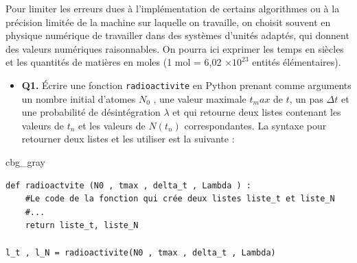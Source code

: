 \documentclass[%
oneside,                 %
final,                   %
10pt]{article}
\newenvironment{_cod_tight}[1]{
   \def\FrameCommand{\colorbox{#1}}
   \FrameRule0.6pt\MakeFramed {\FrameRestore}\vskip3mm}
   {\vskip0mm\endMakeFramed}
\newenvironment{cod}[1]{
\bgroup\rmfamily
\fboxsep=0mm\relax
\begin{_cod_tight}{#1}
\list{}{\parsep=-2mm\parskip=0mm\topsep=0pt\leftmargin=2mm
\rightmargin=2\leftmargin\leftmargin=4pt\relax}
\item\relax}
{\endlist\end{_cod_tight}\egroup}
\begin{document}
\vspace{6mm}



Pour limiter les erreurs dues à l’implémentation de certains algorithmes ou à la précision limitée de la machine sur laquelle on travaille, on choisit souvent en physique numérique de travailler dans des systèmes d’unités adaptés, qui donnent des valeurs numériques raisonnables. On pourra ici exprimer les temps en siècles et les quantités de matières en moles (1 mol = 6,02 $\times 10^{23}$ entités élémentaires).

\begin{itemize}
\item \textbf{Q1.} Écrire une fonction \texttt{radioactivite} en Python prenant comme arguments un nombre initial d’atomes $N_0$ , une valeur maximale $t_max$ de $t$, un pas $\Delta t$ et une probabilité de désintégration $\lambda$ et qui retourne deux listes contenant les valeurs de $t_n$ et les valeurs de $N(t_n)$ correspondantes. La syntaxe pour retourner deux listes et les utiliser est la suivante :
\end{itemize}

\noindent
\begin{cod}{cbg_gray}\begin{verbatim}
def radioactvite (N0 , tmax , delta_t , Lambda ) :
    #Le code de la fonction qui crée deux listes liste_t et liste_N
    #...
    return liste_t, liste_N

l_t , l_N = radioactivite(N0 , tmax , delta_t , Lambda)
\end{verbatim}
\end{cod}
\noindent
\end{document}
